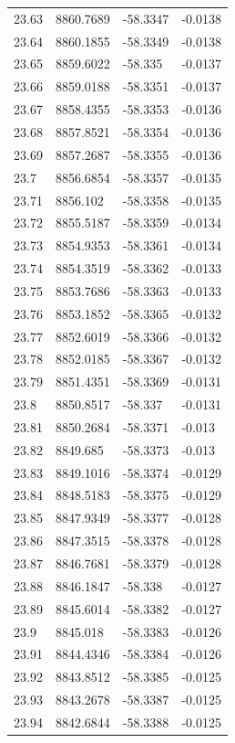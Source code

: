 \begin{table}[H]
\begin{tabular}{llll}
23.63 & 8860.7689 & -58.3347 & -0.0138 \\
23.64 & 8860.1855 & -58.3349 & -0.0138 \\
23.65 & 8859.6022 & -58.335 & -0.0137 \\
23.66 & 8859.0188 & -58.3351 & -0.0137 \\
23.67 & 8858.4355 & -58.3353 & -0.0136 \\
23.68 & 8857.8521 & -58.3354 & -0.0136 \\
23.69 & 8857.2687 & -58.3355 & -0.0136 \\
23.7 & 8856.6854 & -58.3357 & -0.0135 \\
23.71 & 8856.102 & -58.3358 & -0.0135 \\
23.72 & 8855.5187 & -58.3359 & -0.0134 \\
23.73 & 8854.9353 & -58.3361 & -0.0134 \\
23.74 & 8854.3519 & -58.3362 & -0.0133 \\
23.75 & 8853.7686 & -58.3363 & -0.0133 \\
23.76 & 8853.1852 & -58.3365 & -0.0132 \\
23.77 & 8852.6019 & -58.3366 & -0.0132 \\
23.78 & 8852.0185 & -58.3367 & -0.0132 \\
23.79 & 8851.4351 & -58.3369 & -0.0131 \\
23.8 & 8850.8517 & -58.337 & -0.0131 \\
23.81 & 8850.2684 & -58.3371 & -0.013 \\
23.82 & 8849.685 & -58.3373 & -0.013 \\
23.83 & 8849.1016 & -58.3374 & -0.0129 \\
23.84 & 8848.5183 & -58.3375 & -0.0129 \\
23.85 & 8847.9349 & -58.3377 & -0.0128 \\
23.86 & 8847.3515 & -58.3378 & -0.0128 \\
23.87 & 8846.7681 & -58.3379 & -0.0128 \\
23.88 & 8846.1847 & -58.338 & -0.0127 \\
23.89 & 8845.6014 & -58.3382 & -0.0127 \\
23.9 & 8845.018 & -58.3383 & -0.0126 \\
23.91 & 8844.4346 & -58.3384 & -0.0126 \\
23.92 & 8843.8512 & -58.3385 & -0.0125 \\
23.93 & 8843.2678 & -58.3387 & -0.0125 \\
23.94 & 8842.6844 & -58.3388 & -0.0125 \\

\end{tabular}
\end{table}
